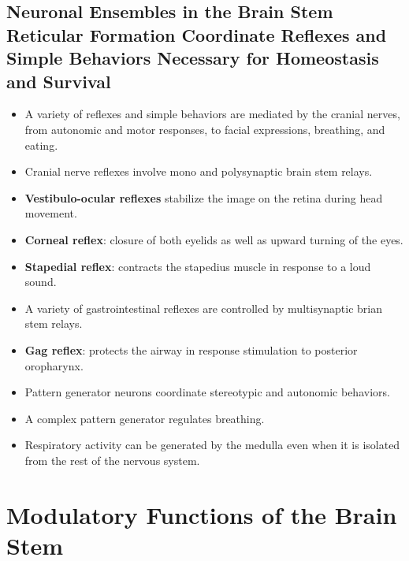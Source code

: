 \documentclass[12pt,a4paper]{article}
\begin{document}
\subsection{Neuronal Ensembles in the Brain Stem Reticular Formation Coordinate Reflexes and Simple Behaviors Necessary for Homeostasis and Survival}
\begin{itemize}
    \item A variety of reflexes and simple behaviors are mediated by the cranial nerves, from autonomic and motor responses, to facial expressions, breathing, and eating.
    \item Cranial nerve reflexes involve mono and polysynaptic brain stem relays.
    \item \textbf{Vestibulo-ocular reflexes} stabilize the image on the retina during head movement.
    \item \textbf{Corneal reflex}: closure of both eyelids as well as upward turning of the eyes.
    \item \textbf{Stapedial reflex}: contracts the stapedius muscle in response to a loud sound.
    \item A variety of gastrointestinal reflexes are controlled by multisynaptic brian stem relays.
    \item \textbf{Gag reflex}: protects the airway in response stimulation to posterior oropharynx. 
    \item Pattern generator neurons coordinate stereotypic and autonomic behaviors.
    \item A complex pattern generator regulates breathing.
    \item Respiratory activity can be generated by the medulla even when it is isolated from the rest of the nervous system.
\end{itemize}


\clearpage
\section{Modulatory Functions of the Brain Stem}
\end{document}
